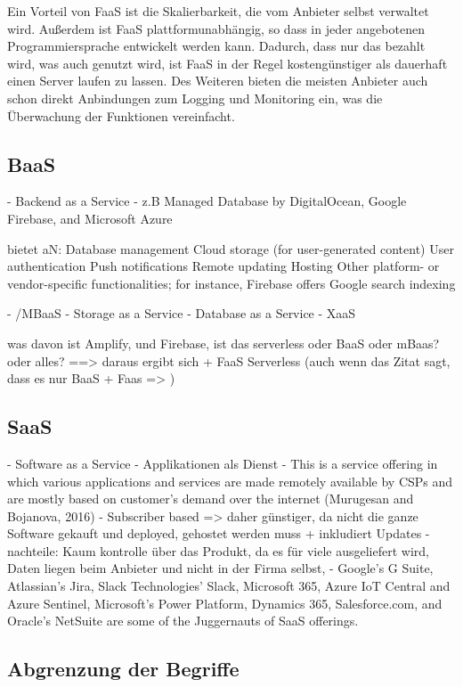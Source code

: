 Ein Vorteil von \ac{FaaS} ist die Skalierbarkeit, die vom Anbieter selbst verwaltet wird. Außerdem ist \ac{FaaS} plattformunabhängig, so dass in jeder angebotenen Programmiersprache entwickelt werden kann. Dadurch, dass nur das bezahlt wird, was auch genutzt wird, ist \ac{FaaS} in der Regel kostengünstiger als dauerhaft einen Server laufen zu lassen. Des Weiteren bieten die meisten Anbieter auch schon direkt Anbindungen zum Logging und Monitoring ein, was die Überwachung der Funktionen vereinfacht.

\subsection{\acl{BaaS}}

- Backend as a Service
    - z.B Managed Database by DigitalOcean, Google Firebase, and Microsoft Azure

bietet aN:
  Database management
  Cloud storage (for user-generated content)
  User authentication
  Push notifications
  Remote updating
  Hosting
  Other platform- or vendor-specific functionalities; for instance, Firebase offers Google search indexing

- /MBaaS
- Storage as a Service
- Database as a Service
- XaaS

was davon ist Amplify, und Firebase, ist das serverless oder BaaS oder mBaas? oder alles?
==> daraus ergibt sich + FaaS Serverless (auch wenn das Zitat sagt, dass es nur BaaS + Faas => )

\subsection{\acl{SaaS}}

- Software as a Service
    - Applikationen als Dienst
    - This is a service offering in which various applications and services are made remotely available by CSPs and are mostly based on customer’s demand over the internet (Murugesan and Bojanova, 2016)
    - Subscriber based => daher günstiger, da nicht die ganze Software gekauft und deployed, gehostet werden muss + inkludiert Updates
    - nachteile: Kaum kontrolle über das Produkt, da es für viele ausgeliefert wird, Daten liegen beim Anbieter und nicht in der Firma selbst,
    - Google’s G Suite, Atlassian’s Jira, Slack Technologies’ Slack, Microsoft 365, Azure IoT Central and Azure Sentinel, Microsoft’s Power Platform, Dynamics 365, Salesforce.com, and Oracle’s NetSuite are some of the Juggernauts of SaaS offerings.

\subsection{Abgrenzung der Begriffe}

